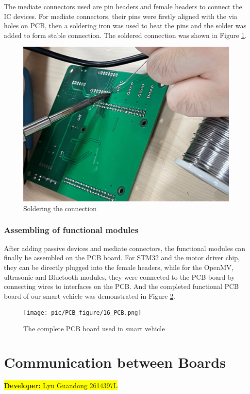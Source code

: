 \documentclass[12pt, a4paper, oneside]{report}
\begin{document}
\noindent
The mediate connectors used are pin headers and female headers to connect the IC devices. For mediate connectors, their pins were firstly aligned with the via holes on PCB, then a soldering iron was used to heat the pins and the solder was added to form stable connection. The soldered connection was shown in Figure \ref{fig:pcb15}.
\begin{figure}[!h]
	\centering
	\includegraphics[scale=0.05]{pic/PCB_figure/15_PCB.jpg}
	\caption{Soldering the connection}
    \label{fig:pcb15}
\end{figure}
\subsubsection{Assembling of functional modules}
After adding passive devices and mediate connectors, the functional modules can finally be assembled on the PCB board. For STM32 and the motor driver chip, they can be directly plugged into the female headers, while for the OpenMV, ultrasonic and Bluetooth modules, they were connected to the PCB board by connecting wires to interfaces on the PCB. And the completed functional PCB board of our smart vehicle was demonstrated in Figure \ref{fig:pcb16}.

\begin{figure}[!h]
	\centering
	\texttt{[image: pic/PCB\_figure/16\_PCB.png]}
	\caption{The complete PCB board used in smart vehicle}
    \label{fig:pcb16}
\end{figure}

\newpage
\section{Communication between Boards}\label{sec:itc}
\colorbox{yellow}{\textbf{Developer:} Lyu Guandong 2614397L}
\end{document}

